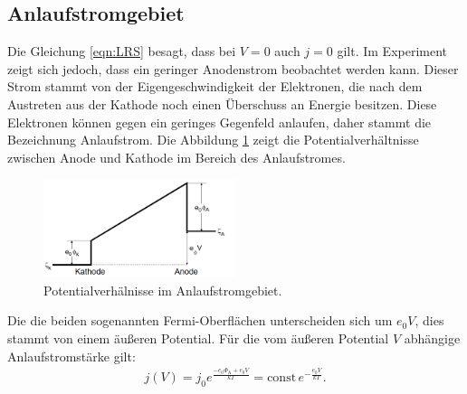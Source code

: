 \subsection{Anlaufstromgebiet}
Die Gleichung \eqref{eqn:LRS} besagt, dass bei $V=0$ auch $j=0$ gilt. Im Experiment zeigt sich jedoch,
dass ein geringer Anodenstrom beobachtet werden kann. Dieser Strom stammt von der Eigengeschwindigkeit
der Elektronen, die nach dem Austreten aus der Kathode noch einen Überschuss an Energie besitzen.
Diese Elektronen können gegen ein geringes Gegenfeld anlaufen, daher stammt die Bezeichnung Anlaufstrom.
Die Abbildung \ref{fig:pv} zeigt die Potentialverhältnisse zwischen Anode und Kathode im Bereich des Anlaufstromes.
\begin{figure}
 \centering
 \includegraphics[width=0.5\textwidth]{pv.png}
 \caption{Potentialverhälnisse im Anlaufstromgebiet.\cite{sample}}
 \label{fig:pv}
 \end{figure}
Die die beiden sogenannten Fermi-Oberflächen unterscheiden sich um $e_\mathrm{0}V$, dies stammt von einem
äußeren Potential. Für die vom äußeren Potential $V$  abhängige Anlaufstromstärke gilt:
\begin{align}
j(V)=j_\mathrm{0}e^{\frac{-e_\mathrm{0}\Phi_\mathrm{A}+e_\mathrm{0}V}{kT}}=\mathrm{const} \, e^{-\frac{e_\mathrm{0}V}{kT}}\label{eqn:pot}.
\end{align}

